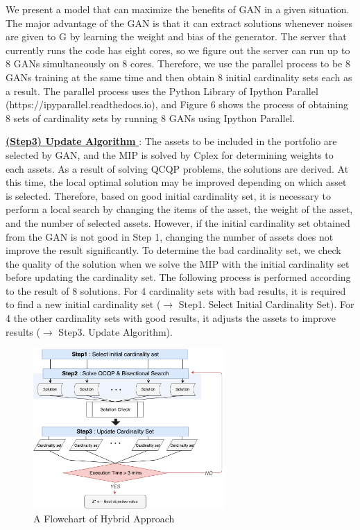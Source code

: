 \documentclass[11pt]{article}
\begin{document}
	
	We present a model that can maximize the benefits of GAN in a given situation. The major advantage of the GAN is that it can extract solutions whenever noises are given to G by learning the weight and bias of the generator.
	The server that currently runs the code has eight cores, so we figure out the server can run up to 8 GANs simultaneously on 8 cores. Therefore, we use the parallel process to be 8 GANs training at the same time and then obtain 8 initial cardinality sets each as a result. The parallel process uses the Python Library of Ipython Parallel (https://ipyparallel.readthedocs.io), and Figure 6 shows the process of obtaining 8 sets of cardinality sets by running 8 GANs using Ipython Parallel.
	
	\underline{\textbf{(Step3) Update Algorithm }} :  The assets to be included in the portfolio are selected by GAN, and the MIP is solved by Cplex for determining weights to each assets. 
	As a result of solving QCQP problems, the solutions are derived. At this time, the local optimal solution may be improved depending on which asset is selected. Therefore, based on good initial cardinality set, it is necessary to perform a local search by changing the items of the asset, the weight of the asset, and the number of selected assets. However, if the initial cardinality set obtained from the GAN is not good in Step 1, changing the number of assets does not improve the result significantly. To determine the bad cardinality set, we check the quality of the solution when we solve the MIP with the initial cardinality set before updating the cardinality set. The following process is performed according to the result of 8 solutions. For 4 cardinality sets with bad results, it is required to find a new initial cardinality set ($\rightarrow$ Step1. Select Initial Cardinality Set). For 4 the other cardinality sets with good results, it adjusts the assets to improve results ($\rightarrow$ Step3. Update Algorithm). 
	
	
	\begin{figure}[h] 
		\begin{center}
			\includegraphics[width=0.65\textwidth]{step3}
			\caption{A Flowchart of Hybrid Approach} \label{fig:step3}
		\end{center}
	\end{figure}
	
\end{document}

